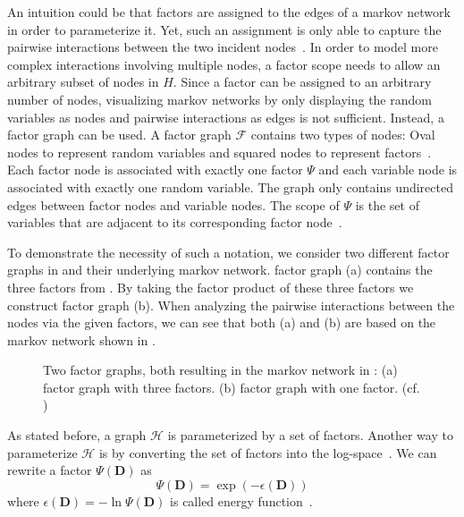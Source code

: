 \bigskip

An intuition could be that \glspl{factor} are assigned to the edges of a \gls{markov network} in order to parameterize it.
Yet, such an \gls{assignment} is only able to capture the pairwise interactions between the two incident nodes~\citep{koller2009probabilistic}.
In order to model more complex interactions involving multiple nodes, a \gls{factor scope} needs to allow an arbitrary subset of nodes in $H$.
Since a factor can be assigned to an arbitrary number of nodes, visualizing \glspl{markov network} by only displaying the random variables as nodes and pairwise interactions as edges is not sufficient.
Instead, a \gls{factor graph} can be used.
A \gls{factor graph} $\mathcal{F}$ contains two types of \glspl{node}: Oval \glspl{node} to represent \glspl{random variable} and squared \glspl{node} to represent \glspl{factor}~\citep{koller2009probabilistic}.
Each factor node is associated with exactly one \gls{factor} $\Psi$ and each variable node is associated with exactly one \gls{random variable}.
The graph only contains undirected edges between factor nodes and variable nodes.
The scope of $\Psi$ is the set of variables that are adjacent to its corresponding factor node~\citep{koller2009probabilistic}.

To demonstrate the necessity of such a notation, we consider two different \glspl{factor graph} in  and their underlying \gls{markov network}.
\Gls{factor graph} (a) contains the three factors from .
By taking the \gls{factor product} of these three \glspl{factor} we construct \gls{factor graph} (b).
When analyzing the pairwise interactions between the nodes via the given \glspl{factor}, we can see that both (a) and (b) are based on the \gls{markov network} shown in  .

\begin{figure}[t]
\centering
  
\caption[Two factor graphs resulting in the same Markov network]{%
  Two \glspl{factor graph}, both resulting in the \gls{markov network} in :
  (a) \Gls{factor graph} with three \glspl{factor}.
  (b) \Gls{factor graph} with one \gls{factor}.
  (cf. \citep{koller2009probabilistic})
}
\label{fig:example-factor-graphs}
\end{figure}

\bigskip

As stated before, a graph $\mathcal{H}$ is parameterized by a set of \glspl{factor}.
Another way to parameterize $\mathcal{H}$ is by converting the set of \glspl{factor} into the log-space~\citep{koller2009probabilistic}.
We can rewrite a factor $\Psi(\mathbf{D})$ as
\begin{equation*}
  \label{equ:energy-function}
  \Psi(\mathbf{D}) = \exp(-\epsilon(\mathbf{D}))
\end{equation*}
where $\epsilon(\mathbf{D})=-\ln\Psi(\mathbf{D})$ is called \gls{energy function}~\citep{koller2009probabilistic}.

